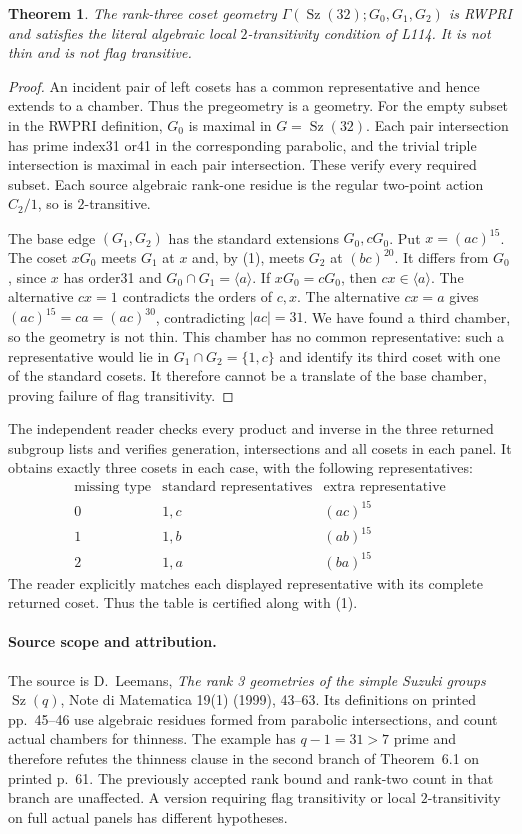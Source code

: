 \documentclass[11pt,a4paper]{article}
\newtheorem{theorem}{Theorem}
\newcommand{\gen}[1]{\langle#1\rangle}
\newcommand{\Sz}{\operatorname{Sz}}
\begin{document}
\begin{theorem}
The rank-three coset geometry $\Gamma(\Sz(32);G_0,G_1,G_2)$ is RWPRI
and satisfies the literal algebraic local $2$-transitivity condition
of L114. It is not thin and is not flag transitive.
\end{theorem}
\begin{proof}
An incident pair of left cosets has a common representative and hence
extends to a chamber. Thus the pregeometry is a geometry.
For the empty subset in the RWPRI definition, $G_0$ is maximal in
$G=\Sz(32)$. Each pair intersection has prime index31 or41 in the
corresponding parabolic, and the trivial triple intersection is maximal
in each pair intersection. These verify every required subset.
Each source algebraic rank-one residue is the regular two-point
action $C_2/1$, so is $2$-transitive.

The base edge $(G_1,G_2)$ has the standard extensions $G_0,cG_0$.
Put $x=(ac)^{15}$. The coset $xG_0$ meets $G_1$ at $x$ and, by (1),
meets $G_2$ at $(bc)^{20}$. It differs from $G_0$, since $x$ has
order31 and $G_0\cap G_1=\gen a$. If $xG_0=cG_0$, then
$cx\in\gen a$. The alternative $cx=1$ contradicts the orders of
$c,x$. The alternative $cx=a$ gives $(ac)^{15}=ca=(ac)^{30}$,
contradicting $|ac|=31$. We have found a third chamber, so the geometry
is not thin. This chamber has no common representative: such a
representative would lie in $G_1\cap G_2=\{1,c\}$ and identify its
third coset with one of the standard cosets. It therefore cannot be a
translate of the base chamber, proving failure of flag transitivity.
\end{proof}

The independent reader checks every product and inverse in the three
returned subgroup lists and verifies generation, intersections and all
cosets in each panel. It obtains exactly three cosets in each case,
with the following representatives:
\[
\begin{array}{c|c|c}
\text{missing type}&\text{standard representatives}&\text{extra representative}\\\hline
0&1,c&(ac)^{15}\\
1&1,b&(ab)^{15}\\
2&1,a&(ba)^{15}
\end{array}
\]
The reader explicitly matches each displayed representative with its
complete returned coset. Thus the table is certified along with (1).

\paragraph{Source scope and attribution.}
The source is D.~Leemans, \emph{The rank 3 geometries of the simple
Suzuki groups $\Sz(q)$}, Note di Matematica 19(1) (1999), 43--63.
Its definitions on printed pp.~45--46 use algebraic residues formed
from parabolic intersections, and count actual chambers for thinness.
The example has $q-1=31>7$ prime and therefore refutes the thinness
clause in the second branch of Theorem~6.1 on printed p.~61.
The previously accepted rank bound and rank-two count in that branch
are unaffected. A version requiring flag transitivity or local
$2$-transitivity on full actual panels has different hypotheses.
\end{document}
